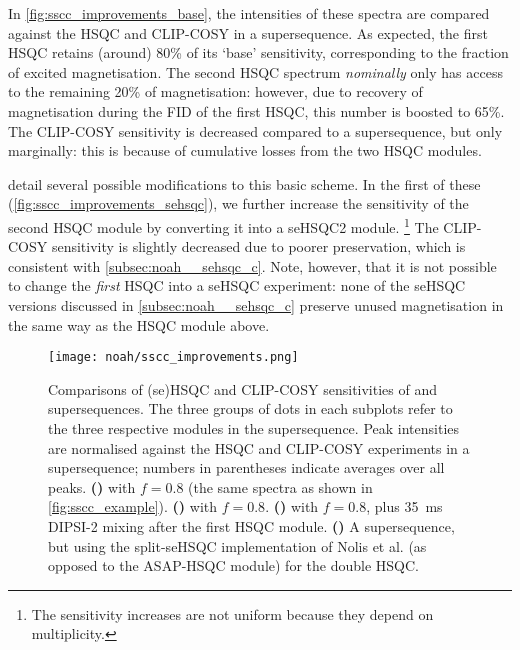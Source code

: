 In \cref{fig:sscc_improvements_base}, the intensities of these spectra are compared against the HSQC and CLIP-COSY in a  supersequence.
As expected, the first HSQC retains (around) 80\% of its `base' sensitivity, corresponding to the fraction of excited magnetisation.
The second HSQC spectrum \textit{nominally} only has access to the remaining 20\% of magnetisation: however, due to recovery of  magnetisation during the FID of the first HSQC, this number is boosted to 65\%.
The CLIP-COSY sensitivity is decreased compared to a  supersequence, but only marginally: this is because of cumulative losses from the two HSQC modules.

 detail several possible modifications to this basic scheme.
In the first of these (\cref{fig:sscc_improvements_sehsqc}), we further increase the sensitivity of the second HSQC module by converting it into a seHSQC2 module.%
\footnote{The sensitivity increases are not uniform because they depend on multiplicity.}
The CLIP-COSY sensitivity is slightly decreased due to poorer  preservation, which is consistent with \cref{subsec:noah__sehsqc_c}.
Note, however, that it is not possible to change the \textit{first} HSQC into a seHSQC experiment: none of the seHSQC versions discussed in \cref{subsec:noah__sehsqc_c} preserve unused  magnetisation in the same way as the HSQC module above.

\begin{figure}[!ht]
    \centering
    \texttt{[image: noah/sscc\_improvements.png]}%
    {\label{fig:sscc_improvements_base}}%
    {\label{fig:sscc_improvements_sehsqc}}%
    {\label{fig:sscc_improvements_dipsi}}%
    {\label{fig:sscc_improvements_split_sehsqc}}%
    \caption[Sensitivity comparisons for  and  supersequences]{
        Comparisons of (se)HSQC and CLIP-COSY sensitivities of  and  supersequences.
        The three groups of dots in each subplots refer to the three respective modules in the supersequence.
        Peak intensities are normalised against the HSQC and CLIP-COSY experiments in a  supersequence; numbers in parentheses indicate averages over all peaks.
        \textbf{()}  with $f = 0.8$ (the same spectra as shown in \cref{fig:sscc_example}).
        \textbf{()}  with $f = 0.8$.
        \textbf{()}  with $f = 0.8$, plus \qty{35}{\ms} DIPSI-2 mixing after the first HSQC module.
        \textbf{()} A  supersequence, but using the split-seHSQC implementation of Nolis et al.\autocite{Nolis2019CPC} (as opposed to the ASAP-HSQC module) for the double HSQC.
    }
    \label{fig:sscc_improvements}
\end{figure}

